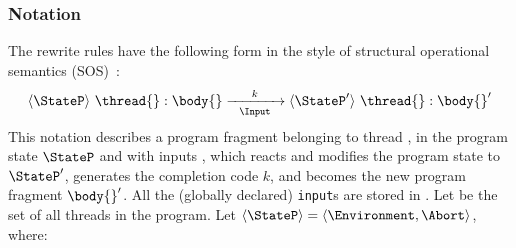 
\subsubsection{Notation}
\label{sec:forec_semantics:notation}
The rewrite rules have the following form in the style of 
structural operational semantics (SOS)~\cite{semantics_sos}:
\begin{equation*}
	\langle \StateP \rangle ~ \thread{}:\body{} 
		\xrightarrow[~~\Input~~]{k} 
	\langle \StateP' \rangle ~ \thread{}:\body{}'
\end{equation*}
This notation describes a program fragment \body{} belonging to thread \thread{},
in the program state $\StateP$ and with inputs \Input{}, which
reacts and modifies the program state to $\StateP'$, generates the 
completion code $k$, and becomes the new program fragment $\body{}'$. 
All the (globally declared) \verb$input$s are stored in \Input{}. 
Let \Thread{} be the set of all threads in the program. 
Let $\langle \StateP \rangle = \langle \Environment, \Abort \rangle$, where:
